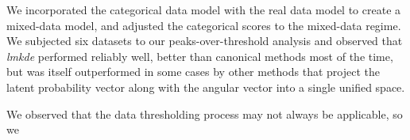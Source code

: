 We incorporated the categorical data model with the real data model to create a 
    mixed-data model, and adjusted the categorical scores to the mixed-data 
    regime.  We subjected six datasets to our peaks-over-threshold analysis and 
    observed that \emph{lmkde} performed reliably well, better than canonical 
    methods most of the time, but was itself outperformed in some cases by other 
    methods that project the latent probability vector along with the angular 
    vector into a single unified space.

We observed that the data thresholding process may not always be applicable, so 
    we
    
